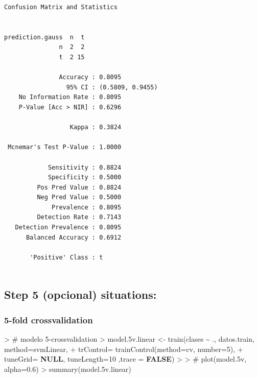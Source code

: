 \documentclass[
]{article}
\newenvironment{Shaded}{\begin{snugshade}}{\end{snugshade}}
\newcommand{\AttributeTok}[1]{\textcolor[rgb]{0.80,0.80,0.80}{#1}}
\newcommand{\CommentTok}[1]{\textcolor[rgb]{0.50,0.62,0.50}{#1}}
\newcommand{\ConstantTok}[1]{\textcolor[rgb]{0.86,0.64,0.64}{\textbf{#1}}}
\newcommand{\DecValTok}[1]{\textcolor[rgb]{0.86,0.86,0.80}{#1}}
\newcommand{\ErrorTok}[1]{\textcolor[rgb]{0.76,0.75,0.62}{#1}}
\newcommand{\FloatTok}[1]{\textcolor[rgb]{0.75,0.75,0.82}{#1}}
\newcommand{\FunctionTok}[1]{\textcolor[rgb]{0.94,0.94,0.56}{#1}}
\newcommand{\NormalTok}[1]{\textcolor[rgb]{0.80,0.80,0.80}{#1}}
\newcommand{\OtherTok}[1]{\textcolor[rgb]{0.94,0.94,0.56}{#1}}
\newcommand{\SpecialCharTok}[1]{\textcolor[rgb]{0.86,0.64,0.64}{#1}}
\newcommand{\StringTok}[1]{\textcolor[rgb]{0.80,0.58,0.58}{#1}}
\begin{document}
\begin{verbatim}
Confusion Matrix and Statistics

                
prediction.gauss  n  t
               n  2  2
               t  2 15
                                          
               Accuracy : 0.8095          
                 95% CI : (0.5809, 0.9455)
    No Information Rate : 0.8095          
    P-Value [Acc > NIR] : 0.6296          
                                          
                  Kappa : 0.3824          
                                          
 Mcnemar's Test P-Value : 1.0000          
                                          
            Sensitivity : 0.8824          
            Specificity : 0.5000          
         Pos Pred Value : 0.8824          
         Neg Pred Value : 0.5000          
             Prevalence : 0.8095          
         Detection Rate : 0.7143          
   Detection Prevalence : 0.8095          
      Balanced Accuracy : 0.6912          
                                          
       'Positive' Class : t               
                                          
\end{verbatim}

\hypertarget{step-5-opcional-situations}{%
\subsection{Step 5 (opcional)
situations:}\label{step-5-opcional-situations}}

\hypertarget{fold-crossvalidation}{%
\subsubsection{5-fold crossvalidation}\label{fold-crossvalidation}}

\begin{Shaded}
\begin{Highlighting}[]
\SpecialCharTok{\textgreater{}} \CommentTok{\# modelo 5{-}crossvalidation }
\ErrorTok{\textgreater{}}\NormalTok{ model}\FloatTok{.5}\NormalTok{v.linear }\OtherTok{\textless{}{-}} \FunctionTok{train}\NormalTok{(clases }\SpecialCharTok{\textasciitilde{}}\NormalTok{ ., datos.train, }\AttributeTok{method=}\StringTok{\textquotesingle{}svmLinear\textquotesingle{}}\NormalTok{, }
\SpecialCharTok{+}                \AttributeTok{trControl=} \FunctionTok{trainControl}\NormalTok{(}\AttributeTok{method=}\StringTok{\textquotesingle{}cv\textquotesingle{}}\NormalTok{, }\AttributeTok{number=}\DecValTok{5}\NormalTok{), }
\SpecialCharTok{+}                \AttributeTok{tuneGrid=} \ConstantTok{NULL}\NormalTok{, }\AttributeTok{tuneLength=}\DecValTok{10}\NormalTok{ ,}\AttributeTok{trace =} \ConstantTok{FALSE}\NormalTok{)}
\SpecialCharTok{\textgreater{}} 
\ErrorTok{\textgreater{}} \CommentTok{\# plot(model.5v, alpha=0.6)}
\ErrorTok{\textgreater{}} \FunctionTok{summary}\NormalTok{(model}\FloatTok{.5}\NormalTok{v.linear)}
\end{Highlighting}
\end{Shaded}
\end{document}
